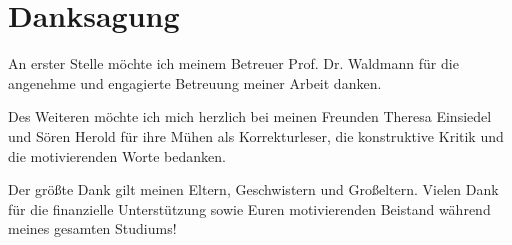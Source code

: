 \chapter*{Danksagung}
\thispagestyle{empty}

An erster Stelle möchte ich meinem Betreuer Prof. Dr. Waldmann für die angenehme und engagierte Betreuung meiner Arbeit danken.

Des Weiteren möchte ich mich herzlich bei meinen Freunden Theresa Einsiedel und Sören Herold für ihre Mühen als Korrekturleser, die konstruktive Kritik und die motivierenden Worte bedanken.

Der größte Dank gilt meinen Eltern, Geschwistern und Großeltern. Vielen Dank für die finanzielle Unterstützung sowie Euren motivierenden Beistand während meines gesamten Studiums!